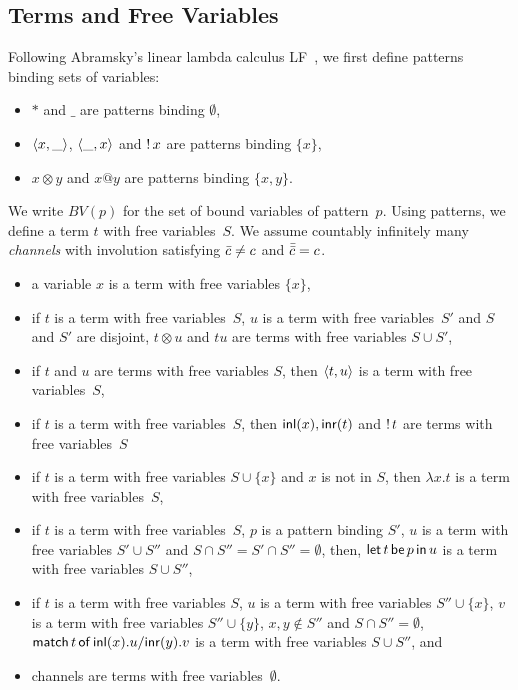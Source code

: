 \subsection{Terms and Free Variables}

Following Abramsky's linear lambda calculus
LF~\citep{abramsky1993computational}, we first define patterns
binding sets of variables:
\begin{itemize}
 \item $\ast$ and $\_$ are patterns binding $\emptyset$,
 \item $\langle{x,\_}\rangle$, $\langle{\_,x}\rangle$ and $\mathop{!} x$ are patterns binding
       $\{x\}$,
 \item $x\otimes y$ and $x@y$ are patterns binding $\{x,y\}$.
\end{itemize}
We write $BV(p)$ for the set of bound variables of pattern~$p$.
Using patterns, we define a term $t$ with free variables~$S$.
We assume countably infinitely many \textit{channels}
with involution
satisfying $\bar{c}\neq c$ and $\bar{\bar{c}} = c$.
\begin{itemize}
 \item a variable $x$ is a term with free variables $\{x\}$,
 \item if $t$ is a term with free variables~$S$, $u$ is a term with
       free variables~$S'$ and $S$ and $S'$ are disjoint, $t\otimes u$ and
       $tu$ are terms with free variables $S\cup S'$,
 \item if $t$ and $u$ are terms with free variables $S$, then
       $\langle{t,u}\rangle$ is a term with free variables~$S$,
 \item if $t$ is a term with free variables~$S$, then
       $\mathsf{inl}({x}), \mathsf{inr}({t})$ and $\mathop{!} t$ are terms with free variables~$S$
 \item if $t$ is a term with free variables $S\cup \{x\}$ and $x$ is not
       in $S$, then $\lambda x.t$ is a term with free variables~$S$,
 \item if $t$ is a term with free variables~$S$, $p$ is a pattern
       binding $S'$, $u$ is a term with free variables $S'\cup S''$ and
       $S\cap S'' = S'\cap S'' = \emptyset$, then,
       $\mathsf{let }\,{t}\,\mathsf{ be }\,{p}\,\mathsf{ in }\,{u}$ is a term with free variables $S\cup S''$,
 \item if $t$ is a term with free variables $S$,
       $u$ is a term with free variables $S''\cup \{x\}$,
       $v$ is a term with free variables $S''\cup \{y\}$,
       $x,y\notin S''$ and $S\cap S'' = \emptyset$,
       $\mathsf{match}\,{t}\,\mathsf{of}\, \mathsf{inl}({x}). {u}/ \mathsf{inr}({y}). {v}$ is a term with free variables $S\cup S''$, and
 \item channels are terms with free variables~$\emptyset$.
\end{itemize}
